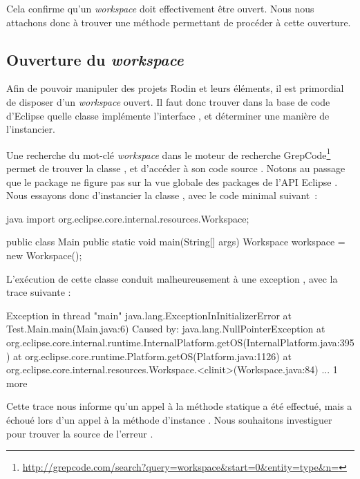 Cela confirme qu'un \textit{workspace} doit effectivement être ouvert.
Nous nous attachons donc à trouver une méthode permettant de procéder à cette ouverture.


\subsection{Ouverture du \textit{workspace}}

Afin de pouvoir manipuler des projets Rodin et leurs éléments, il est primordial de disposer d'un \textit{workspace} ouvert.
Il faut donc trouver dans la base de code d'Eclipse quelle classe implémente l'interface , et déterminer une manière de l'instancier.

Une recherche du mot-clé \textit{workspace} dans le moteur de recherche GrepCode\footnote{%
\url{http://grepcode.com/search?query=workspace&start=0&entity=type&n=}} %
permet de trouver la classe , et d'accéder à son code source \cite{eclipseworkspace}.
Notons au passage que le package  ne figure pas sur la vue globale des packages de l'API Eclipse \cite{eclipseapioverview}.
Nous essayons donc d'instancier la classe , avec le code minimal suivant~:

\begin{imtaCode}{java}
import org.eclipse.core.internal.resources.Workspace;    

public class Main {
    public static void main(String[] args) {
        Workspace workspace = new Workspace();
    }
}
\end{imtaCode}

L'exécution de cette classe conduit malheureusement à une exception , avec la trace suivante :

\begin{imtaConsole}
Exception in thread "main" java.lang.ExceptionInInitializerError
	at Test.Main.main(Main.java:6)
Caused by: java.lang.NullPointerException
	at org.eclipse.core.internal.runtime.InternalPlatform.getOS(InternalPlatform.java:395)
	at org.eclipse.core.runtime.Platform.getOS(Platform.java:1126)
	at org.eclipse.core.internal.resources.Workspace.<clinit>(Workspace.java:84)
	... 1 more
\end{imtaConsole}

Cette trace nous informe qu'un appel à la méthode statique  a été effectué, mais a échoué lors d'un appel à la méthode d'instance %
.
Nous souhaitons investiguer pour trouver la source de l'erreur .


